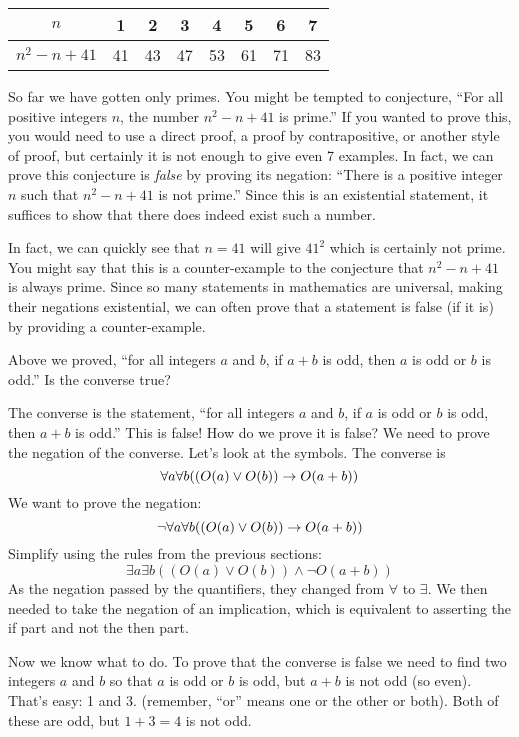 \documentclass[12pt]{article}
\begin{document}
\begin{center}
\begin{tabular}{c|c|c|c|c|c|c|c}
$n$ & 1 & 2 & 3 & 4 & 5 & 6 & 7\\ \hline
$n^2 - n + 41$ & 41 & 43 & 47 & 53 & 61 & 71 & 83
 \end{tabular}
\end{center}

So far we have gotten only primes.  You might be tempted to conjecture, ``For all positive integers $n$, the number $n^2 - n + 41$ is prime.''  If you wanted to prove this, you would need to use a direct proof, a proof by contrapositive, or another style of proof, but certainly it is not enough to give even 7 examples.  In fact, we can prove this conjecture is {\em false} by proving its negation: ``There is a positive integer $n$ such that $n^2 - n + 41$ is not prime.''  Since this is an existential statement, it suffices to show that there does indeed exist such a number.

In fact, we can quickly see that $n = 41$ will give $41^2$ which is certainly not prime.  You might say that this is a counter-example to the conjecture that $n^2 - n + 41$ is always prime.  Since so many statements in mathematics are universal, making their negations existential, we can often prove that a statement is false (if it is) by providing a counter-example.

\begin{example}
     Above we proved, ``for all integers $a$ and $b$, if $a+b$ is odd, then $a$ is odd or $b$ is odd.''  Is the converse true?
     
     \begin{solution}
     The converse is the statement, ``for all integers $a$ and $b$, if $a$ is odd or $b$ is odd, then $a + b$ is odd.''  This is false!  How do we prove it is false?  We need to prove the negation of the converse.  Let's look at the symbols.  The converse is
          \[\forall a \forall b ((O(a) \vee O(b)) \rightarrow O(a+b))\]
          We want to prove the negation:
          \[\neg \forall a \forall b ((O(a) \vee O(b)) \rightarrow O(a+b))\]
          Simplify using the rules from the previous sections:
          \[\exists a \exists b ((O(a) \vee O(b)) \wedge \neg O(a+b))\]
          As the negation passed by the quantifiers, they changed from $\forall$ to $\exists$.  We then needed to take the negation of an implication, which is equivalent to asserting the if part and not the then part.  
          
          Now we know what to do.  To prove that the converse is false we need to find two integers $a$ and $b$ so that $a$ is odd or $b$ is odd, but $a+b$ is not odd (so even).  That's easy: 1 and 3.  (remember, ``or'' means one or the other or both).  Both of these are odd, but $1+3 = 4$ is not odd.
     \end{solution}
     
\end{example}
 
\end{document}
